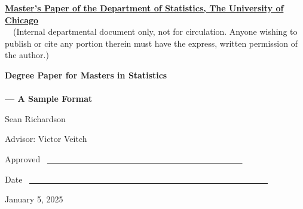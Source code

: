 \documentclass[12pt]{article}
\begin{document}
    \noindent
    \thispagestyle{empty}
    \underline{\bf Master's Paper of the Department of Statistics, The University of Chicago}
    \\~~(Internal departmental document only, not for circulation. Anyone wishing to publish or cite any portion therein must have the express, written permission of the author.)

    \vspace{1.8in}
    \begin{center}
    {\bf\LARGE Degree Paper for Masters in Statistics}
    \\~\\
    {\bf\Large --- A Sample Format}


    \vspace{1.4in}
    {\Large Sean Richardson}

    \vspace{1.3in}
    {\Large Advisor: Victor Veitch}

    \end{center}

    \vspace{.6in}
    {\Large Approved} ~\underline{~~~~~~~~~~~~~~~~~~
    ~~~~~~~~~~~~~~~~~~~~~~~~~~~~}

    \vspace{.2in}
    {\Large Date} ~\underline{~~~~~~~~~~~~~~~~~~~~~~~~~~~~~~~~~~~~~~~~~~~~~~~~~~~~~~~~~}

    \vfill
    \begin{center}{\large January 5, 2025}\end{center}
    
\end{document}
